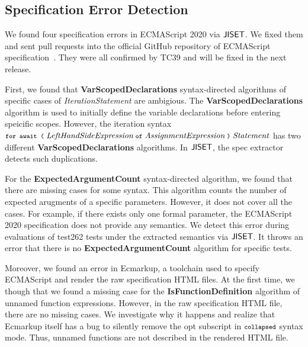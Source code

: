 
\subsection{Specification Error Detection}

We found four specification errors in ECMAScript 2020 via \( \text{\sf JISET} \).
We fixed them and sent pull requests into the official GitHub repository of
ECMAScript specification~\cite{es2020}. They were all confirmed by TC39
and will be fixed in the next release.

First, we found that \textbf{VarScopedDeclarations} syntax-directed algorithms of
specific cases of \textit{IterationStatement} are ambigious.
The \textbf{VarScopedDeclarations} algorithm is used to initially define
the variable declarations before entering speicific scopes. However, the iteration syntax
\( \texttt{\footnotesize for await (} \; \textit{LeftHandSideExpression} \; \texttt{\footnotesize of} \;
\textit{AssignmentExpression} \; \texttt{\footnotesize)} \; \textit{Statement} \)
has two different \textbf{VarScopedDeclarations} algorithms.
In \( \text{\sf JISET} \), the spec extractor detects such duplications.

For the \textbf{ExpectedArgumentCount} syntax-directed algorithm, we found that
there are missing cases for some syntax. This algorithm counts the number of
expected arugments of a specific parameters. However, it does not cover all
the cases. For example, if there exists only one formal parameter,
the ECMAScript 2020 specification does not provide any semantics.
We detect this error during evaluations of test262 tests under
the extracted semantics via \( \text{\sf JISET} \). It throws an error that there
is no \textbf{ExpectedArgumentCount} algorithm for specific tests.

Moreover, we found an error in \textsf{Ecmarkup}, a toolchain used to specify ECMAScript
and render the raw specification HTML files.
At the first time, we though that we found a missing case for the \textbf{IsFunctionDefinition}
algorithm of unnamed function expressions. However, in the raw specification HTML file,
there are no missing cases. We investigate why it happens and realize that \textsf{Ecmarkup}
itself has a bug to silently remove the {\small opt} subscript in
\( \texttt{\footnotesize collapsed} \) syntax mode. Thus, unnamed functions are not described
in the rendered HTML file.
